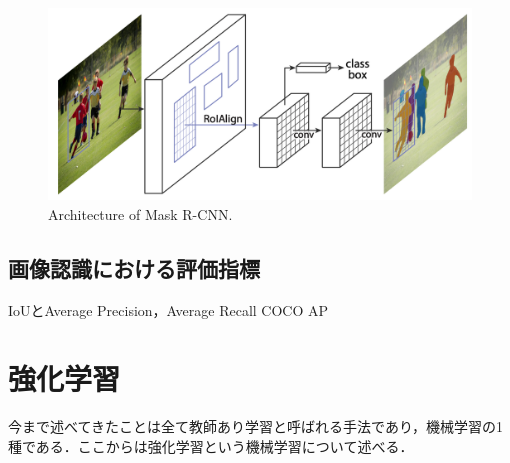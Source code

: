\begin{figure}
    \centering
    \includegraphics[width=0.7\linewidth]{figure/chapter2/mrcnn}
    \caption[Architecture of Mask R-CNN.]{Architecture of Mask R-CNN\cite{MaskRCNN}.}
    \label{fig:mrcnn}
\end{figure}



\subsection{画像認識における評価指標}
IoUとAverage Precision，Average Recall
COCO AP




\section{強化学習}\label{sec:強化学習}
今まで述べてきたことは全て教師あり学習と呼ばれる手法であり，機械学習の1種である．ここからは強化学習という機械学習について述べる．

